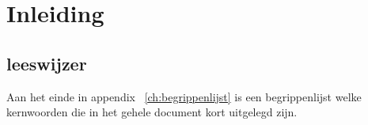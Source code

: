 \chapter*{Inleiding} \label{ch:inleiding} %
\lipsum[01]

\section{leeswijzer} \label{sec:leeswijzer}
Aan het einde in appendix ~\ref{ch:begrippenlijst} is een begrippenlijst welke kernwoorden die in het gehele document kort uitgelegd zijn.


